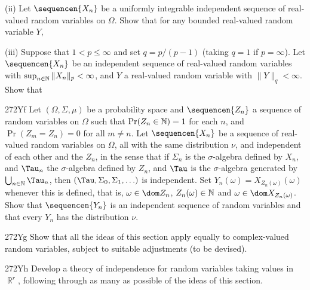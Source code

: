 {

\noindent {}

\quad (ii) Let $\sequencen{X_n}$ be a uniformly integrable independent
sequence of real-valued
random variables on $\Omega$.   Show that for any bounded
real-valued random variable $Y$,


\quad(iii) Suppose that $1<p\le\infty$ and set $q=p/(p-1)$ (taking $q=1$
if $p=\infty$).   Let $\sequencen{X_n}$ be an independent sequence of
real-valued
random variables with $\sup_{n\in\Bbb N}\|X_n\|_p<\infty$, and $Y$ a
real-valued random variable with $\|Y\|_q<\infty$.   Show that


\spheader 272Yf
Let $(\Omega,\Sigma,\mu)$ be a probability space and
$\sequencen{Z_n}$  a sequence of
random variables on $\Omega$ such that
$\Pr(Z_n\in\Bbb N)=1$ for each $n$, and $\Pr(Z_m=Z_n)=0$ for all
$m\ne n$.   Let $\sequencen{X_n}$ be a sequence of real-valued random
variables on $\Omega$, all with the same distribution $\nu$, and
independent of each other and the $Z_n$, in the sense that if $\Sigma_n$
is the $\sigma$-algebra defined by $X_n$, and $\Tau_n$ the
$\sigma$-algebra
defined by $Z_n$, and $\Tau$ is the $\sigma$-algebra generated by
$\bigcup_{n\in\Bbb N}\Tau_n$, then $(\Tau,\Sigma_0,\Sigma_1,\ldots)$ is
independent.   Set $Y_n(\omega)=X_{Z_n(\omega)}(\omega)$ whenever this
is defined, that is, $\omega\in\dom Z_n$, $Z_n(\omega)\in\Bbb N$ and
$\omega\in\dom X_{Z_n(\omega)}$.   Show that $\sequencen{Y_n}$ is an
independent sequence of random variables and that every $Y_n$ has the
distribution $\nu$.

\spheader 272Yg
Show that all the ideas of this section apply
equally to complex-valued random variables, subject to suitable
adjustments (to be devised).

\spheader 272Yh  Develop a theory of independence
for random variables taking values in $\BbbR^r$, following through as
many as possible of the ideas of this section.
}%

